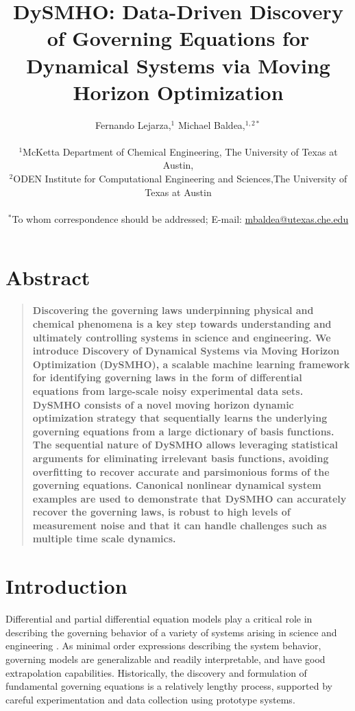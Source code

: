 \documentclass[12pt]{article}
\title{DySMHO: Data-Driven Discovery of Governing Equations for Dynamical Systems via Moving Horizon Optimization}
\author
{Fernando Lejarza,$^{1}$ Michael Baldea,$^{1,2\ast}$\\
\\
\normalsize{$^{1}$McKetta Department of Chemical Engineering, The University of Texas at Austin,}\\
\normalsize{$^{2}$ODEN Institute for Computational Engineering and Sciences,The University of Texas at Austin}\\
\\
\normalsize{$^\ast$To whom correspondence should be addressed; E-mail:  \url{mbaldea@utexas.che.edu}}
}
\date{}
\newenvironment{sciabstract}{%
\begin{quote} \bf}
{\end{quote}}
\begin{document}
\newcommand{\ours}{DySMHO}


\baselineskip18pt


\maketitle



\section*{Abstract}
\begin{sciabstract}
Discovering the governing laws underpinning physical and chemical phenomena is a  key step towards understanding and ultimately controlling  systems in  science and engineering. We introduce Discovery of Dynamical Systems via Moving Horizon Optimization (DySMHO), a scalable machine learning framework for identifying governing laws in the form of differential equations from large-scale noisy experimental data sets. \ours{} consists of a novel moving horizon dynamic optimization strategy that sequentially  learns the underlying governing equations from a large dictionary of basis functions. The sequential nature of DySMHO allows leveraging statistical arguments for eliminating irrelevant basis functions, avoiding overfitting to recover accurate and parsimonious forms of the governing equations. Canonical nonlinear dynamical system examples are used to demonstrate that \ours{} can accurately recover the governing laws, is robust to high levels of measurement noise and that it can handle challenges such as multiple time scale dynamics.
\end{sciabstract}



\section*{Introduction}
Differential and partial differential equation models play a critical role in describing the governing behavior of a variety of systems arising in science and engineering \cite{gockenbach2005partial}. As minimal order expressions describing the system behavior, governing models are generalizable and readily interpretable, and have  good extrapolation capabilities. Historically, the discovery and formulation of fundamental governing equations is a relatively lengthy process,  supported by careful experimentation and data collection using prototype systems.
\end{document}
